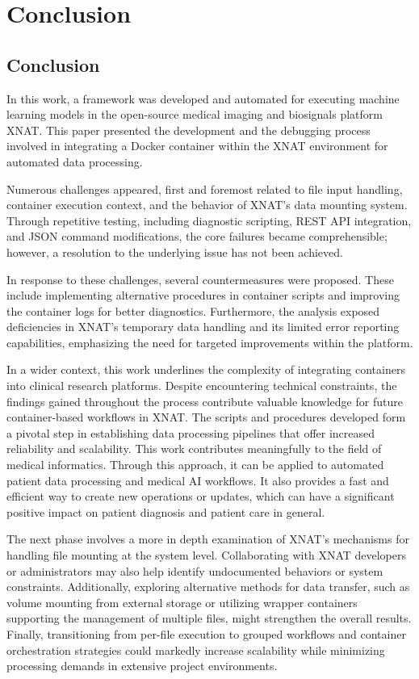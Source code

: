 

\chapter{Conclusion}

\section{Conclusion}
In this work, a framework was developed and automated for executing machine learning models in the open-source medical imaging and biosignals platform XNAT. This paper presented the development and the debugging process involved in integrating a Docker container within the XNAT environment for automated data processing.

Numerous challenges appeared, first and foremost related to file input handling, container execution context, and the behavior of XNAT's data mounting system. Through repetitive testing, including diagnostic scripting, REST API integration, and JSON command modifications, the core failures became comprehensible; however, a resolution to the underlying issue has not been achieved.

In response to these challenges, several countermeasures were proposed. These include implementing alternative procedures in container scripts and improving the container logs for better diagnostics. Furthermore, the analysis exposed deficiencies in XNAT’s temporary data handling and its limited error reporting capabilities, emphasizing the need for targeted improvements within the platform.

In a wider context, this work underlines the complexity of integrating containers into clinical research platforms. Despite encountering technical constraints, the findings gained throughout the process contribute valuable knowledge for future container-based workflows in XNAT. The scripts and procedures developed form a pivotal step in establishing data processing pipelines that offer increased reliability and scalability. This work contributes meaningfully to the field of medical informatics. Through this approach, it can be applied to automated patient data processing and medical AI workflows. It also provides a fast and efficient way to create new operations or updates, which can have a significant positive impact on patient diagnosis and patient care in general.

The next phase involves a more in depth examination of XNAT's mechanisms for handling file mounting at the system level. Collaborating with XNAT developers or administrators may also help identify undocumented behaviors or system constraints. Additionally, exploring alternative methods for data transfer, such as volume mounting from external storage or utilizing wrapper containers supporting the management of multiple files, might strengthen the overall results. Finally, transitioning from per-file execution to grouped workflows and container orchestration strategies could markedly increase scalability while minimizing processing demands in extensive project environments.



